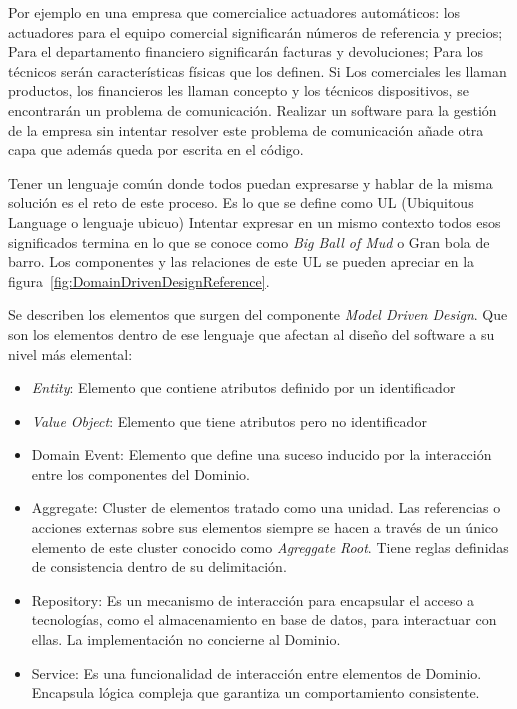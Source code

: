 Por ejemplo en una empresa que comercialice actuadores automáticos: los actuadores para el equipo comercial significarán números de referencia y precios;
Para el departamento financiero significarán facturas y devoluciones;
Para los técnicos serán características físicas que los definen.
Si Los comerciales les llaman productos, los financieros les llaman concepto y los técnicos dispositivos, se encontrarán un problema de comunicación.
Realizar un software para la gestión de la empresa sin intentar resolver este problema de comunicación añade otra capa que además queda por escrita en el código.


Tener un lenguaje común donde todos puedan expresarse y hablar de la misma solución es el reto de este proceso.
Es lo que se define como \gls{UL} (Ubiquitous Language o lenguaje ubicuo) Intentar expresar en un mismo contexto todos esos significados termina en lo que se conoce como \textit{Big Ball of Mud} o Gran bola de barro.
Los componentes y las relaciones de este UL se pueden apreciar en la figura~\cref{fig:DomainDrivenDesignReference}.

Se describen los elementos que surgen del componente \textit{Model Driven Design}.
Que son los elementos dentro de ese lenguaje que afectan al diseño del software a su nivel más elemental:

\begin{itemize}
    \item \textit{Entity}: Elemento que contiene atributos definido por un identificador
    \item \textit{Value Object}: Elemento que tiene atributos pero no identificador
    \item Domain Event: Elemento que define una suceso inducido por la interacción entre los componentes del Dominio.
    \item Aggregate: Cluster de elementos tratado como una unidad.
    Las referencias o acciones externas sobre sus elementos siempre se hacen a través de un único elemento de este cluster conocido como \textit{Agreggate Root}.
    Tiene reglas definidas de consistencia dentro de su delimitación.
    \item Repository: Es un mecanismo de interacción para encapsular el acceso a tecnologías, como el almacenamiento en base de datos, para interactuar con ellas.
    La implementación no concierne al Dominio.
    \item Service: Es una funcionalidad de interacción entre elementos de Dominio.
    Encapsula lógica compleja que garantiza un comportamiento consistente.
\end{itemize}

